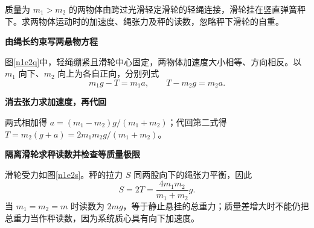 \begin{question}\begin{example}[悬挂滑轮的弹簧秤]\label{n1e2}
质量为 $m_1>m_2$ 的两物体由跨过光滑轻定滑轮的轻绳连接，滑轮挂在竖直弹簧秤下。求两物体运动时的加速度、绳张力及秤的读数，忽略秤下滑轮的自重。
\end{example}\end{question}
\begin{solution}\textbf{由绳长约束写两悬物方程}\par\nobreak
图\ref{n1e2q}中，轻绳绷紧且滑轮中心固定，两物体加速度大小相等、方向相反。以 $m_1$ 向下、$m_2$ 向上为各自正向，分别列式
\[
 m_1g-T=m_1a,\qquad T-m_2g=m_2a.
\]


\par\medskip{}\noindent\textbf{消去张力求加速度，再代回}\par\nobreak
两式相加得 $a=(m_1-m_2)g/(m_1+m_2)$；代回第二式得 $T=m_2(g+a)=2m_1m_2g/(m_1+m_2)$。


\par\medskip{}\noindent\textbf{隔离滑轮求秤读数并检查等质量极限}\par\nobreak
滑轮受力如图\ref{n1e2s}。秤的拉力 $S$ 同两股向下的绳张力平衡，因此
\[S=2T=\frac{4m_1m_2}{m_1+m_2}g.\]
当 $m_1=m_2=m$ 时读数为 $2mg$，等于静止悬挂的总重力；质量差增大时不能仍把总重力当作秤读数，因为系统质心具有向下加速度。
\end{solution}

